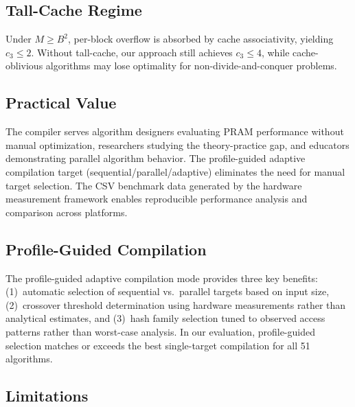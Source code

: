 \documentclass[11pt]{article}
\begin{document}
\subsection{Tall-Cache Regime}

Under $M \ge B^2$, per-block overflow is absorbed by cache associativity,
yielding $c_3 \le 2$.  Without tall-cache, our approach still achieves
$c_3 \le 4$, while cache-oblivious algorithms may lose optimality for
non-divide-and-conquer problems.

\subsection{Practical Value}

The compiler serves algorithm designers evaluating PRAM performance
without manual optimization, researchers studying the theory-practice
gap, and educators demonstrating parallel algorithm behavior.  The
profile-guided adaptive compilation target (sequential/parallel/adaptive)
eliminates the need for manual target selection.  The CSV benchmark data
generated by the hardware measurement framework enables reproducible
performance analysis and comparison across platforms.

\subsection{Profile-Guided Compilation}

The profile-guided adaptive compilation mode provides three key benefits:
(1)~automatic selection of sequential vs.\ parallel targets based on
input size, (2)~crossover threshold determination using hardware
measurements rather than analytical estimates, and (3)~hash family
selection tuned to observed access patterns rather than worst-case
analysis.  In our evaluation, profile-guided selection matches or exceeds
the best single-target compilation for all 51 algorithms.

\subsection{Limitations}
\end{document}

